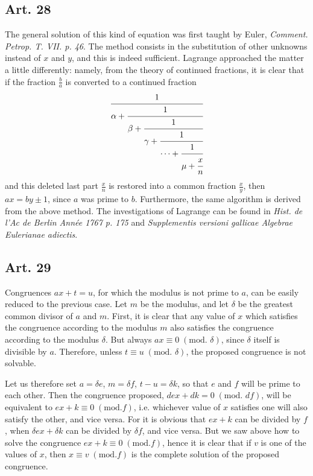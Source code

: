 \documentclass{book}
\theoremstyle{plain}
\theoremstyle{remark}
\begin{document}
\subsection*{Art. 28}

The general solution of this kind of equation was first taught by Euler, \textit{Comment. Petrop. T. VII. p. 46}.  The method consists in the substitution of other unknowns instead of $x$ and $y$, and this is indeed sufficient. Lagrange approached the matter a little differently: namely, from the theory of continued fractions, it is clear that if the fraction $\frac{b}{a}$ is converted to a continued fraction
\[ \cfrac{1}{\alpha + \cfrac{1}{\beta+ \cfrac{1}{\gamma +\cfrac{1}{\cdots + \cfrac{1}{\mu + \cfrac{x}{n}}}}}} \]
and this deleted last part $\frac{x}{n}$ is restored into a common fraction $\frac{x}{y}$, then $ax = by \pm 1$, since $a$ was prime to $b$.  Furthermore, the same algorithm is derived from the above method.  The investigations of Lagrange can be found in \textit{Hist. de l'Ac de Berlin Ann\'ee 1767 p. 175} and \textit{Supplementis versioni gallicae Algebrae Eulerianae adiectis}.

\subsection*{Art. 29}

Congruences $ax+t = u$, for which the modulus is not prime to $a$, can be easily reduced to the previous case.   Let $m$ be the modulus, and let $\delta$ be the greatest common divisor of $a$ and $m$.  First, it is clear that any value of $x$ which satisfies the congruence according to the modulus $m$ also satisfies the congruence according to the modulus $\delta$.  But always $ax \equiv 0 \; (\textrm{mod. }\delta)$, since $\delta$ itself is divisible by $a$.  Therefore, unless $t \equiv u\;(\textrm{mod. } \delta)$, the proposed congruence is not solvable. 

Let us therefore set $a = \delta e$, $m = \delta f$, $t-u = \delta k$, so that $e$ and $f$ will be prime to each other.  Then the congruence proposed, $dex + dk = 0 \;(\textrm{mod. } df)$, will be equivalent to $ex + k \equiv 0 \; (\textrm{mod.} f)$, i.e. whichever value of $x$ satisfies one will also satisfy the other, and vice versa.  For it is obvious that $ex+k$ can be divided by $f$, when $\delta ex + \delta k$ can be divided by $\delta f$, and vice versa.    But we saw above how to solve the congruence $ex+k\equiv0\;(\mathrm{mod. } f)$, hence it is clear that if $v$ is one of the values of $x$, then $x \equiv v \;(\mathrm{mod. } f)$ is the complete solution of the proposed congruence.
\end{document}
